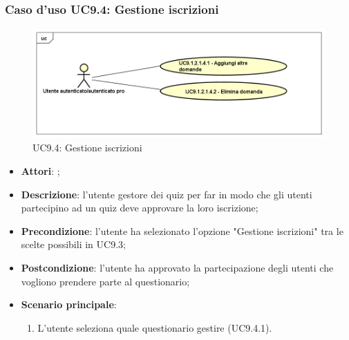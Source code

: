 	 \subsubsection{Caso d'uso UC9.4: Gestione iscrizioni}
	 \label{UC9.4}
	 \begin{figure}[h]
	 	\centering
	 	\includegraphics[scale=0.5,keepaspectratio]{UML/UC9_4.png}
	 	\caption{UC9.4: Gestione iscrizioni}
	 \end{figure}
	 \FloatBarrier
	 \begin{itemize}
	 	\item \textbf{Attori}: \uaupro;
	 	\item \textbf{Descrizione}: l'utente gestore dei quiz per far in modo che gli utenti partecipino ad un quiz deve approvare la loro iscrizione;
	 	\item \textbf{Precondizione}: l'utente ha selezionato l'opzione "Gestione iscrizioni" tra le scelte possibili in UC9.3;
	 	\item \textbf{Postcondizione}: l'utente ha approvato la partecipazione degli utenti che vogliono prendere parte al questionario;
	 	\item \textbf{Scenario principale}: 
	 	\begin{enumerate}
	 		\item L'utente seleziona quale questionario gestire (UC9.4.1).
	 	\end{enumerate}
	 \end{itemize}
	 
